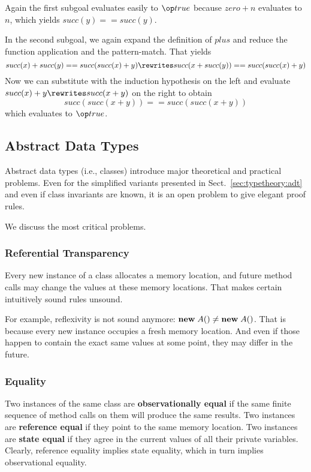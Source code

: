 \begin{example}
Again the first subgoal evaluates easily to $\true$ because $zero+n$ evaluates to $n$, which yields $succ(y)==succ(y)$.

In the second subgoal, we again expand the definition of $plus$ and reduce the function application and the pattern-match.
That yields
\[succ(x)+succ(y)==succ(succ(x)+y) \rewrites succ(x+succ(y))==succ(succ(x)+y)\]
Now we can substitute with the induction hypothesis on the left and evaluate $succ(x)+y\rewrites succ(x+y)$ on the right to obtain
\[succ(succ(x+y))==succ(succ(x+y))\]
which evaluates to $\true$.
\end{example}

\subsection{Abstract Data Types}

Abstract data types (i.e., classes) introduce major theoretical and practical problems.
Even for the simplified variants presented in Sect.~\ref{sec:typetheory:adt} and even if class invariants are known, it is an open problem to give elegant proof rules.

We discuss the most critical problems.

\subsubsection{Referential Transparency}

Every new instance of a class allocates a memory location, and future method calls may change the values at these memory locations.
That makes certain intuitively sound rules unsound.

For example, reflexivity is not sound anymore: ${\rm \bf new}\; A()\neq {\rm \bf new}\; A()$.
That is because every new instance occupies a fresh memory location.
And even if those happen to contain the exact same values at some point, they may differ in the future.

\subsubsection{Equality}

Two instances of the same class are \textbf{observationally equal} if the same finite sequence of method calls on them will produce the same results.
Two instances are \textbf{reference equal} if they point to the same memory location.
Two instances are \textbf{state equal} if they agree in the current values of all their private variables.
Clearly, reference equality implies state equality, which in turn implies observational equality.

